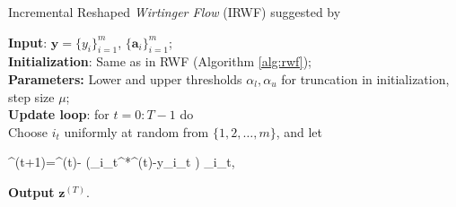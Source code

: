 	\begin{algorithm}[th] 
		\caption{Incremental Reshaped \emph{Wirtinger Flow} (IRWF) suggested by \cite{bib:rfw-irwf}}\label{alg:irwf}
		\textbf{Input}: $\boldsymbol{y}=\{y_i\}_{i=1}^m$, $\{\boldsymbol{a}_i\}_{i=1}^m$; \\
		\textbf{Initialization}: Same as in RWF (Algorithm \ref{alg:rwf}); \\
		\textbf{Parameters:}  Lower and upper thresholds $\alpha_l,\alpha_u$ for  truncation in initialization, step size $\mu$;\\
		
		 \textbf{Update loop}: for $t=0:T-1$ do\\
		 Choose $i_t$ uniformly at random from $\{1,2,\ldots, m\}$, and let
		  \begin{flalign}
				\boldsymbol{z}^{(t+1)}=^{(t)}- \mu\left(_{i_t}^*^{(t)}-y_{i_t}\cdot{} \right) _{i_t}, \label{eq:incrementalupdate}
		\end{flalign}
		\textbf{Output} $\boldsymbol{z}^{(T)}$.
		\end{algorithm}



